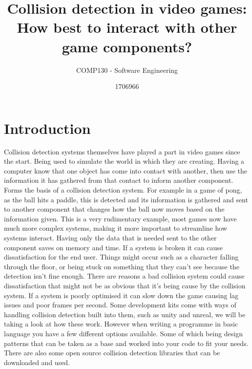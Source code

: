 \documentclass{scrartcl}
\title{Collision detection in video games: How best to interact with other game components?
}
\subtitle{COMP130 - Software Engineering}
\author{1706966}
\begin{document}
	
	\maketitle
	
	
	\section{Introduction}
	Collision detection systems themselves have played a part in video games since the start. Being used to simulate the world in which they are creating. Having a computer know that one object has come into contact with another, then use the information it has gathered from that contact to inform another component. Forms the basis of a collision detection system. For example in a game of pong, as the ball hits a paddle, this is detected and its information is gathered and sent to another component that changes how the ball now moves based on the information given. This is a very rudimentary example, most games now have much more complex systems, making it more important to streamline how systems interact. Having only the data that is needed sent to the other component saves on memory and time.
	If a system is broken it can cause dissatisfaction for the end user. Things might occur such as a character falling through the floor, or being stuck on something that they can't see because the detection isn't fine enough. There are reasons a bad collision system could cause dissatisfaction that might not be as obvious that it's being cause by the collision system. If a system is poorly optimised it can slow down the game causing lag issues and poor frames per second.
	Some development kits come with ways of handling collision detection built into them, such as unity and unreal, we will be taking a look at how these work. However when writing a programme in basic language you have a few different options available. Some of which being design patterns that can be taken as a base and worked into your code to fit your needs. There are also some open source collision detection libraries that can be downloaded and used. 
	
\end{document}
